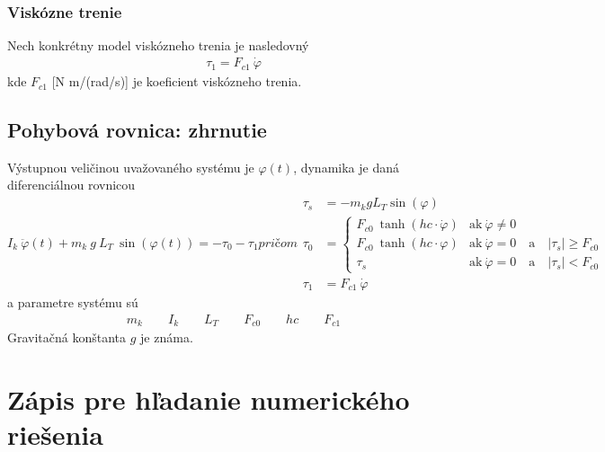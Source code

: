 \documentclass[a4paper, 10pt, ]{article}
\begin{document}
\subsubsection{Viskózne trenie}
Nech konkrétny model viskózneho trenia je nasledovný
\begin{align}
    \tau_1 = F_{c1} \ \dot \varphi
\end{align}
kde $F_{c1}$ [N m/(rad/s)] je koeficient viskózneho trenia.




\subsection{Pohybová rovnica: zhrnutie}

Výstupnou veličinou uvažovaného systému je $\varphi(t)$, dynamika je daná diferenciálnou rovnicou
\begin{subequations}
\begin{equation} 
    I_k \  \ddot\varphi(t) + m_k \  g \   L_T \  \sin(\varphi(t)) = - \tau_0 - \tau_1
\end{equation}
pričom
\begin{align}
    \tau_s &= - m_k g L_T \sin(\varphi) \\
    \tau_0 &= 
    \begin{cases} 
        F_{c0} \ \tanh(hc\cdot \dot \varphi) & \text{ak}   \ \dot \varphi \neq 0  \\
        F_{c0} \ \tanh(hc\cdot      \varphi) & \text{ak}   \ \dot \varphi = 0 \quad \text{a} \quad \left|\tau_s\right| \geq F_{c0} \\
        \tau_s &  \text{ak}  \ \dot \varphi = 0 \quad \text{a} \quad \left|\tau_s\right| < F_{c0}
    \end{cases}  \\
    \tau_1 &= F_{c1} \ \dot \varphi
\end{align}
\end{subequations}
a parametre systému sú
\begin{align}
    m_k \qquad I_k \qquad L_T \qquad F_{c0} \qquad hc \qquad F_{c1}
\end{align}
Gravitačná konštanta $g$ je známa.


\section{Zápis pre hľadanie numerického riešenia}
\end{document}
